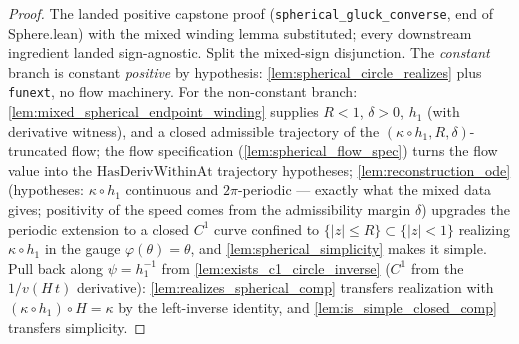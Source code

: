 \begin{proof}
        \leanok
  The landed positive capstone proof (\texttt{spherical\_gluck\_converse}, end of
  Sphere.lean) with the mixed winding lemma substituted; every downstream
  ingredient landed sign-agnostic. Split the mixed-sign disjunction. The
  \emph{constant} branch is constant \emph{positive} by hypothesis:
  \cref{lem:spherical_circle_realizes} plus \texttt{funext}, no flow
  machinery. For the non-constant branch:
  \cref{lem:mixed_spherical_endpoint_winding} supplies $R<1$, $\delta>0$,
  $h_1$ (with derivative witness), and a closed admissible trajectory of the
  $(\kappa\circ h_1,R,\delta)$-truncated flow; the flow specification
  (\cref{lem:spherical_flow_spec}) turns the flow value into the
  $\mathrm{HasDerivWithinAt}$ trajectory hypotheses;
  \cref{lem:reconstruction_ode} (hypotheses: $\kappa\circ h_1$ continuous and
  $2\pi$-periodic — exactly what the mixed data gives; positivity of the
  speed comes from the admissibility margin $\delta$) upgrades the periodic
  extension to a closed $C^1$ curve confined to
  $\{|z|\le R\}\subset\{|z|<1\}$ realizing $\kappa\circ h_1$ in the gauge
  $\varphi(\theta)=\theta$, and \cref{lem:spherical_simplicity} makes it
  simple. Pull back along $\psi=h_1^{-1}$ from
  \cref{lem:exists_c1_circle_inverse} ($C^1$ from the $1/v(H\,t)$ derivative):
  \cref{lem:realizes_spherical_comp} transfers realization with
  $(\kappa\circ h_1)\circ H=\kappa$ by the left-inverse identity, and
  \cref{lem:is_simple_closed_comp} transfers simplicity.
\end{proof}
